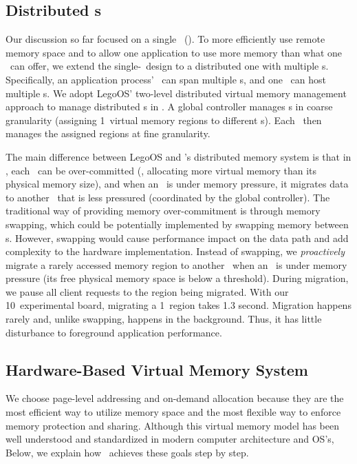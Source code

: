 \subsection{Distributed \MN{}s}
\label{sec:dist}
Our discussion so far focused on a single \MN\ (\sysboard).
To more efficiently use remote memory space and to allow one application to use more memory than what one \sysboard\ can offer, we extend the single-\MN\ design to a distributed one with multiple \MN{}s.
Specifically, an application process' \rspace\ can span multiple \MN{}s, and one \MN\ can host multiple \rspace{}s.
We adopt LegoOS' two-level distributed virtual memory management approach to manage distributed \MN{}s in \sys.
A global controller manages \rspace{}s in coarse granularity (assigning 1\GB\ virtual memory regions to different \MN{}s).
Each \MN\ then manages the assigned regions at fine granularity.

The main difference between LegoOS and \sys's distributed memory system is that in \sys, each \MN\ can be over-committed (\ie, allocating more virtual memory than its physical memory size), and when an \MN\ is under memory pressure, it migrates data to another \MN\ that is less pressured (coordinated by the global controller).
The traditional way of providing memory over-commitment is through memory swapping, which could be potentially implemented by swapping memory between \MN{}s. 
However, swapping would cause performance impact on the data path and add complexity to the hardware implementation.
Instead of swapping, we \textit{proactively} migrate a rarely accessed memory region to another \MN\ when an \MN\ is under memory pressure (its free physical memory space is below a threshold).
During migration, we pause all client requests to the region being migrated.
With our 10\Gbps\ experimental board, migrating a 1\GB\ region takes 1.3 second.
Migration happens rarely and, unlike swapping, happens in the background.
Thus, it has little disturbance to foreground application performance.



\subsection{Hardware-Based Virtual Memory System} 
\label{sec:memory}

We choose page-level addressing and on-demand allocation because they are the most 
efficient way to utilize memory space
and the most flexible way to enforce memory protection and sharing.
Although this virtual memory model has been well understood and standardized in modern computer architecture and OS's,
Below, we explain how \sys\ achieves these goals step by step.

